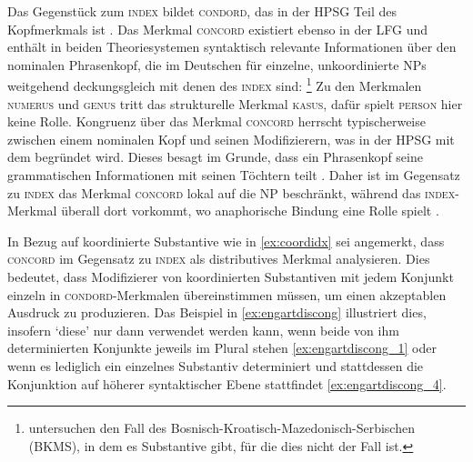 \begin{exe}
\ex\label{ex:coordidx}
\begin{xlist}
\end{xlist}
\end{exe}

\label{phsec:concord}
Das Gegenstück zum \textsc{index} bildet \textsc{condord}, das in der HPSG Teil
des Kopfmerkmals ist \citep[17]{wechslerzlatic2003}. Das Merkmal
\textsc{concord} existiert ebenso in der LFG \citep[189--192]{bresnanetal2016}
und enthält in beiden Theoriesystemen syntaktisch relevante Informationen über
den nominalen Phrasenkopf, die im Deutschen für einzelne, unkoordinierte NPs
weitgehend deckungsgleich mit denen des \textsc{index} sind:%
%
	\footnote{\citet{wechslerzlatic2003} untersuchen den Fall des
	Bosnisch-Kroatisch-Mazedonisch-Serbischen (BKMS), in dem es Substantive
	gibt, für die dies nicht der Fall ist.}
%
Zu den Merkmalen \textsc{numerus} und \textsc{genus} tritt das strukturelle
Merkmal \textsc{kasus}, dafür spielt \textsc{person} hier keine Rolle.
Kongruenz über das Merkmal \textsc{concord} herrscht typischerweise zwischen
einem nominalen Kopf und seinen Modifizierern, was in der HPSG mit dem
 begründet wird. Dieses besagt im Grunde, dass ein
Phrasenkopf seine grammatischen Informationen mit seinen Töchtern teilt
\autocite[vgl.][22]{wechslerzlatic2003}. Daher ist im Gegensatz zu
\textsc{index} das Merkmal \textsc{concord} lokal auf die NP beschränkt,
während das \textsc{index}-Merkmal überall dort vorkommt, wo anaphorische
Bindung eine Rolle spielt
\parencites[14--16, 22]{wechslerzlatic2003}[189]{bresnanetal2016}.

In Bezug auf koordinierte Substantive wie in \cref{ex:coordidx} sei angemerkt,
dass \citet[76--78]{kingdalrymple2004} \textsc{concord} im Gegensatz zu
\textsc{index} als distributives Merkmal analysieren. Dies bedeutet, dass
Modifizierer von koordinierten Substantiven mit jedem Konjunkt einzeln in
\textsc{condord}-Merkmalen übereinstimmen müssen, um einen akzeptablen Ausdruck
zu produzieren. Das Beispiel in \cref{ex:engartdiscong} illustriert dies,
insofern  `diese' nur dann verwendet werden kann, wenn beide von ihm
determinierten Konjunkte jeweils im Plural stehen \cref{ex:engartdiscong_1}
oder wenn es lediglich ein einzelnes Substantiv determiniert und stattdessen
die Konjunktion auf höherer syntaktischer Ebene stattfindet
\cref{ex:engartdiscong_4}.

